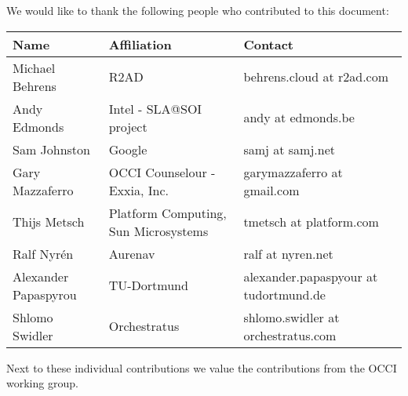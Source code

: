 
We would like to thank the following people who contributed to this
document:

\begin{tabular}{l|p{2in}|p{2in}}
Name & Affiliation & Contact \\
\hline
Michael Behrens & R2AD & behrens.cloud at r2ad.com \\
Andy Edmonds & Intel - SLA@SOI project & andy at edmonds.be \\
Sam Johnston & Google & samj at samj.net \\
Gary Mazzaferro & OCCI Counselour - Exxia, Inc. &  garymazzaferro at gmail.com \\ 
Thijs Metsch & Platform Computing, Sun Microsystems & tmetsch at platform.com \\
Ralf Nyrén & Aurenav & ralf at nyren.net \\
Alexander Papaspyrou & TU-Dortmund & alexander.papaspyour at tu\-dortmund.de \\
Shlomo Swidler & Orchestratus & shlomo.swidler at orchestratus.com \\
\end{tabular}

Next to these individual contributions we value the contributions from
the OCCI working group.


